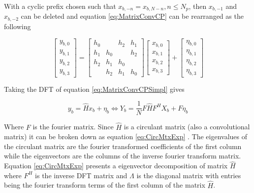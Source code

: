 With a cyclic prefix chosen such that $x_{b,-n} = x_{b,N-n}, n \leq N_p $, then $x_{b,-1}$ and $x_{b,-2}$ can be deleted and equation \ref{eq:MatrixConvCP} can be rearranged as the following

\begin{equation}\label{eq:MatrixConvCPSimpl}
    \begin{bmatrix}
        y_{b,0}
        \\ y_{b,1}
        \\ y_{b,2}
        \\ y_{b,3}
    \end{bmatrix}
    = 
    \begin{bmatrix}
        h_0 &  &h_2 & h_1 \\ 
        h_1 & h_0 & & h_2 \\ 
        h_2 & h_1 & h_0 & \\ 
        & h_2 & h_1 & h_0
    \end{bmatrix}
    \begin{bmatrix}
        x_{b,0}
        \\ x_{b,1}
        \\ x_{b,2}
        \\ x_{b,3}
    \end{bmatrix}
    +
    \begin{bmatrix}
        \eta_{b,0}\\ 
        \eta_{b,1}\\ 
        \eta_{b,2}\\ 
        \eta_{b,3}
    \end{bmatrix}
\end{equation}

Taking the DFT of equation \ref{eq:MatrixConvCPSimpl} gives 

\begin{equation}\label{eq:DFTCP}
    y_b = \hat{H}x_b + \eta_{b} \Leftrightarrow Y_b = \frac{1}{N}F\hat{H}F^HX_b + F\eta_{b}
\end{equation}

Where $F$ is the fourier matrix. Since $\hat{H}$ is a circulant matrix (also a convolutional matrix) it can be broken down as equation \ref{eq:CircMtxExp} \cite{CircMatrixStanford}. The eigenvalues of the circulant matrix are the fourier transformed coefficients of the first column while the eigenvectors are the columns of the inverse fourier transform matrix. Equation \ref{eq:CircMtxExp} presents a eigenvector decomposition of matrix $\hat{H}$ where $F^H$ is the inverse DFT matrix and $\Lambda$ is the diagonal matrix with entries being the fourier transform terms of the first column of the matrix $\hat{H}$.

